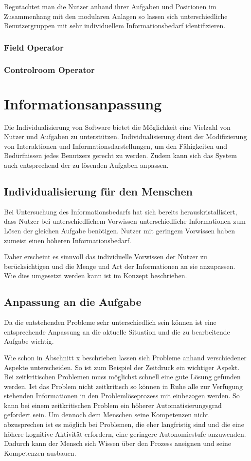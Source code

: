 Begutachtet man die Nutzer anhand ihrer Aufgaben und Positionen im Zusammenhang mit den modularen Anlagen so lassen sich unterschiedliche Benutzergruppen mit sehr individuellem Informationsbedarf identifizieren. 

\subsubsection{Field Operator}

\subsubsection{Controlroom Operator}

\section{Informationsanpassung}
Die Individualisierung von Software bietet die Möglichkeit eine Vielzahl von Nutzer und Aufgaben zu unterstützen. Individualisierung dient der Modifizierung von Interaktionen und Informationsdarstellungen, um den Fähigkeiten und Bedürfnissen jedes Benutzers gerecht zu werden. Zudem kann sich das System auch entsprechend der zu lösenden Aufgaben anpassen.

\subsection{Individualisierung für den Menschen}
Bei Untersuchung des Informationsbedarfs hat sich bereits herauskristallisiert, dass Nutzer bei unterschiedlichem Vorwissen unterschiedliche Informationen zum Lösen der gleichen Aufgabe benötigen. Nutzer mit geringem Vorwissen haben zumeist einen höheren Informationsbedarf. 

Daher erscheint es sinnvoll das individuelle Vorwissen der Nutzer zu berücksichtigen und die Menge und Art der Informationen an sie anzupassen. Wie dies umgesetzt werden kann ist im Konzept beschrieben.

\subsection{Anpassung an die Aufgabe}
Da die entstehenden Probleme sehr unterschiedlich sein können ist eine entsprechende Anpassung an die aktuelle Situation und die zu bearbeitende Aufgabe wichtig.

Wie schon in Abschnitt x beschrieben lassen sich Probleme anhand verschiedener Aspekte unterscheiden. So ist zum Beispiel der Zeitdruck ein wichtiger Aspekt. Bei zeitkritischen Problemen muss möglichst schnell eine gute Lösung gefunden werden. Ist das Problem nicht zeitkritisch so können in Ruhe alle zur Verfügung stehenden Informationen in den Problemlöseprozess mit einbezogen werden. So kann bei einem zeitkritischen Problem ein höherer Automatisierungsgrad gefordert sein. Um dennoch dem Menschen seine Kompetenzen nicht abzusprechen ist es möglich bei Problemen, die eher langfristig sind und die eine höhere kognitive Aktivität erfordern, eine geringere Autonomiestufe anzuwenden. Dadurch kann der Mensch sich Wissen über den Prozess aneignen und seine Kompetenzen ausbauen. 

